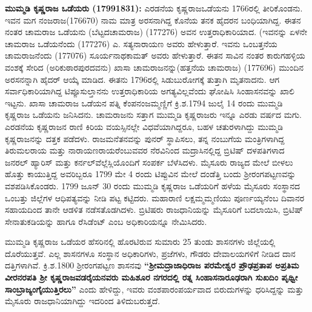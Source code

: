 \newpage

\textbf{ಮುಮ್ಮಡಿ ಕೃಷ್ಣರಾಜ ಒಡೆಯರು (1799\general{\enginline{-}}1831): } ಎರಡನೆಯ ಕೃಷ್ಣರಾಜಒಡೆಯನು 1766ರಲ್ಲಿ ತೀರಿಕೊಂಡನು. ಇವನ ಮಗ ನಂಜರಾಜ(1766\enginline{-}70) ನಾಮ ಮಾತ್ರ ಅರಸನಾಗಿದ್ದ ಕೊನೆಯ ತನಕ ಹೈದರನ ಬಂಧಿಯಾಗಿದ್ದ. ಈತನ ನಂತರ ಚಾಮರಾಜ ಒಡೆಯನು (ಬೆಟ್ಟದಚಾಮರಾಜ) (1772\enginline{-}76) ಅವನ ಉತ್ತರಾಧಿಕಾರಿಯಾದ. (ಇವನನ್ನು ಏಳನೇ ಚಾಮರಾಜ ಒಡೆಯನೆಂದು (1772\enginline{-}76) ಎ. ಸತ್ಯನಾರಾಯಣ ಅವರು ಹೇಳುತ್ತಾರೆ. ಇವನು ಒಂಬತ್ತನೆಯ ಚಾಮರಾಜನೆಂದು (1770\enginline{-}76) ಸೂರ್ಯನಾಥಕಾಮತ್​ ಅವರು ಹೇಳುತ್ತಾರೆ. ಈತನ ಸಾವಿನ ನಂತರ ಕಾರುಗಹಳ್ಳಿಯ ವಂಶಕ್ಕೆ ಸೇರಿದ (ಅರಿಕುಠಾರಪುರದವನು) ಖಾಸಾ ಚಾಮರಾಜನನ್ನು(ಹತ್ತನೆಯ ಚಾಮರಾಜ) (1776\enginline{-}96) ಮುಂದಿನ ಅರಸನನ್ನಾಗಿ ಹೈದರ್​ ಆಯ್ಕೆ ಮಾಡಿದ. ಈತನು 1796ರಲ್ಲಿ ಸಿಡುಬುರೋಗಕ್ಕೆ ತುತ್ತಾಗಿ ಮೃತನಾದನು. ಆಗ ಸರ್ವಾಧಿಕಾರಿಯಾಗಿದ್ದ ಟಿಪ್ಪೂಸುಲ್ತಾನನು ಉತ್ತರಾಧಿಕಾರಿಯ ಅಗತ್ಯವಿಲ್ಲವೆಂದು ಘೋಷಿಸಿ ಸಿಂಹಾಸನವನ್ನು ಖಾಲಿ ಇಟ್ಟನು. ಖಾಸಾ ಚಾಮರಾಜ ಒಡೆಯನ ಪತ್ನಿ ಕೆಂಪನಂಜಮ್ಮಣ್ಣಿಗೆ ಕ್ರಿ.ಶ.1794 ಜುಲೈ 14 ರಂದು ಮುಮ್ಮಡಿ ಕೃಷ್ಣರಾಜ ಒಡೆಯನು ಜನಿಸಿದನು. ಚಾಮರಾಜನು ಸತ್ತಾಗ ಮುಮ್ಮಡಿ ಕೃಷ್ಣರಾಜರು ಇನ್ನೂ ಎರಡು ವರ್ಷದ ಮಗು. ಎರಡನೆಯ ಕೃಷ್ಣರಾಜನ ರಾಣಿ ಕಿರಿಯ ವಯಸ್ಸಿನಲ್ಲೇ ವಿಧವೆಯಾಗಿದ್ದರೂ, ಬಹಳ ಚತುರಳಾಗಿದ್ದು ಮುಮ್ಮಡಿ ಕೃಷ್ಣರಾಜನನ್ನು ದತ್ತಕ ಪಡೆದಳು. ರಾಜಮನೆತನವನ್ನು ಪುನರ್​ ಸ್ಥಾಪಿಸಲು, ತನ್ನ ನಂಬುಗೆಯ ಮಂತ್ರಿಗಳಾಗಿದ್ದ ತಿರುಮಲರಾಯ ಮತ್ತು ನಾರಾಯಣರಾಯರೆಂಬುವವರ ನೆರವಿನಿಂದ ಮದ್ರಾಸಿನಲ್ಲಿದ್ದ ಬ್ರಿಟಿಷ್​ ದಳಪತಿಗಳಾದ ಜನರಲ್​ ಹ್ಯಾರಿಸ್​ ಮತ್ತು ಕರ್ನಲ್​ ವೆಲ್ಲೆಸ್ಲಿಯೊಂದಿಗೆ ಸಂಪರ್ಕ ಬೆಳೆಸಿದಳು. ಮೈಸೂರು ರಾಜ್ಯದ ಮೇಲೆ ಬೀಳಲು ಹೊತ್ತು ಕಾಯುತ್ತಿದ್ದ ಅವರಿಬ್ಬರೂ 1799 ಮೇ 4 ರಂದು ಟಿಪ್ಪುವಿನ ಮೇಲೆ ದಂಡೆತ್ತಿ ಬಂದು ಶ‍್ರೀರಂಗಪಟ್ಟಣವನ್ನು ವಶಪಡಿಸಿಕೊಂಡರು. 1799 ಜೂನ್​ 30 ರಂದು ಮುಮ್ಮಡಿ ಕೃಷ್ಣರಾಜ ಒಡೆಯರಿಗೆ ಹಳೆಯ ಮೈಸೂರು ಸಂಸ್ಥಾನದ ಒಂಬತ್ತು ಜಿಲ್ಲೆಗಳ ಆಧಿಪತ್ಯವನ್ನು ನೀಡಿ ಪಟ್ಟ ಕಟ್ಟಿದರು. ಮಹಾರಾಣಿ ಲಕ್ಷಮ್ಮಮ್ಮಣಿಯು ಪೂರ್ಣಯ್ಯನೆಂಬ ದಿವಾನರ ಸಹಾಯದಿಂದ ತಾನೇ ಆಡಳಿತ ನಡೆಸತೊಡಗಿದಳು. ಬ್ರಿಟಿಷರು ರಾಜಧಾನಿಯನ್ನು ಮೈಸೂರಿಗೆ ಬದಲಾಯಿಸಿ, ಬ್ರಿಟಿಷ್​ ಸೇನಾತುಕಡಿಯನ್ನು ಹಾಗೂ ರೆಸಿಡೆಂಟ್​ ಎಂಬ ಅಧಿಕಾರಿಯನ್ನೂ ನೇಮಿಸಿದರು.

ಮುಮ್ಮಡಿ ಕೃಷ್ಣರಾಜ ಒಡೆಯರ ಹೆಸರಿನಲ್ಲಿ ಹೊರಟಿರುವ ಸುಮಾರು 25 ತುಂಡು ಶಾಸನಗಳು ಜಿಲ್ಲೆಯಲ್ಲಿ ದೊರೆಯುತ್ತವೆ. ಎಲ್ಲ ಶಾಸನಗಳೂ ಸಂಸ್ಥಾನ ಅಧಿಕಾರಿಗಳು, ಪ್ರಜೆಗಳು, ಗೌಡರು ದೇವಾಲಯಗಳಿಗೆ ನೀಡಿದ ದಾನ ದತ್ತಿಗಳಾಗಿವೆ. ಕ್ರಿ.ಶ.1800 ಶ‍್ರೀರಂಗಪಟ್ಟಣ ಶಾಸನವು\textbf{ “ಶ‍್ರೀಮದ್ರಾಜಾಧಿರಾಜ ಪರಮೇಶ್ವರ ಪ್ರೌಢಪ್ರತಾಪ ಅಪ್ರತಿಮ ವೀರನರಪತಿ ಶ‍್ರೀ ಕೃಷ್ಣರಾಜವಡರೈಯ\-ನವರು ಮಹಿಶೂರ ನಗರದಲ್ಲಿ ರತ್ನ ಸಿಂಹಾಸನಾರೂಢರಾಗಿ ಸುಖದಿಂ ಪೃಥ್ವೀ ಸಾಂಬ್ರಾಜ್ಯಂಗೈಯುತ್ತಿರಲು” }ಎಂದು ಹೇಳಿದ್ದು, ಇವರು ವಂಶಪಾರಂಪರ್ಯವಾದ ಬಿರುದುಗಳನ್ನು ಧರಿಸಿದ್ದನ್ನು ಮತ್ತು ಮೈಸೂರು ರಾಜಧಾನಿಯಾಗಿದ್ದು ಇದರಿಂದ ತಿಳಿದು\-ಬರುತ್ತದೆ.

